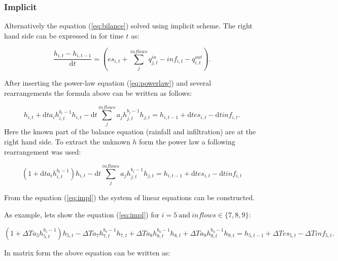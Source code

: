         \subsubsection{Implicit}
        Alternatively the equation (\ref{eq:bilance}) solved using implicit
        scheme. The right hand side can be expressed in for time $t$ as:

        $$
          \frac{h_{i,t} - h_{i,t-1} }{\mathrm{d} t} =  \left(es_{i,t} +
          \sum_j^{inflows} q^{in}_{j,t} - inf_{i,t} - q^{out}_{i,t}\right).
        $$

        After inserting the power-law equation (\ref{eq:powerlaw}) and several rearrangements the formula above can be written 
        as follows: 



        $$
          h_{i,t} + \mathrm{d} t a_ih^{b_{i}-1}_{i,t} h_{i,t} - \mathrm{d} t \sum_j^{inflows}
          a_jh^{b_{j}-1}_{j,t} h_{j,t} = h_{i,t-1} + \mathrm{d} t es_{i,t} - \mathrm{d}
          t inf_{i,t}.
        $$
        Here the known part of the balance equation (rainfall and infiltration) are at the right hand side. To 
        extract the unknown $h$ form the power law a following rearrangement was used:



        \begin{equation}
          (1+\mathrm{d} t a_ih^{b_{i}-1}_{i,t})h_{i,t} - \mathrm{d} t \sum_j^{inflows}
          a_jh^{b_{j}-1}_{j,t} h_{j,t} = h_{i,t-1} + \mathrm{d} t es_{i,t} -
          \mathrm{d} t inf_{i,t}
          \label{eq:impl}
        \end{equation}

        From the equation (\ref{eq:impl}) the system of linear equations can be constructed. 

        As example, lets show the equation (\ref{eq:impl}) for
        $
        i=5\ \mathrm{and}\ inflows\in\{7,8,9\}
        $:


        \begin{dmath}
          (1+\Delta T a_5h^{b_{5}-1}_{5,t})h_{5,t} - \Delta T a_7h^{b_{7}-1}_{7,t} h_{7,t} + \Delta T a_8h^{b_{8}-1}_{8,t} h_{8,t} + \Delta T a_9 h^{b_{9}-1}_{9,t} h_{9,t}  = h_{5,t-1} + \Delta T es_{5,t} - \Delta T inf_{5,t}.
        \end{dmath}

        In matrix form the above equation can be written as:



